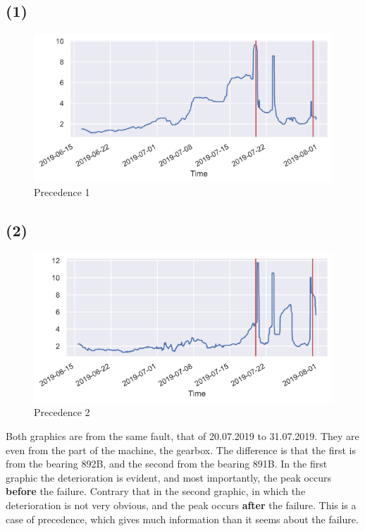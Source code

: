\documentclass[
]{article}
\begin{document}
\hypertarget{section}{%
\subsection{(1)}\label{section}}

\begin{figure}
\centering
\includegraphics{relevant_graphs/prec_1.png}
\caption{Precedence 1}
\end{figure}

\hypertarget{section-1}{%
\subsection{(2)}\label{section-1}}

\begin{figure}
\centering
\includegraphics{relevant_graphs/prec_2.png}
\caption{Precedence 2}
\end{figure}

Both graphics are from the same fault, that of 20.07.2019 to 31.07.2019.
They are even from the part of the machine, the gearbox. The difference
is that the first is from the bearing 892B, and the second from the
bearing 891B. In the first graphic the deterioration is evident, and
most importantly, the peak occurs \textbf{before} the failure. Contrary
that in the second graphic, in which the deterioration is not very
obvious, and the peak occurs \textbf{after} the failure. This is a case
of precedence, which gives much information than it seems about the
failure.
\end{document}
